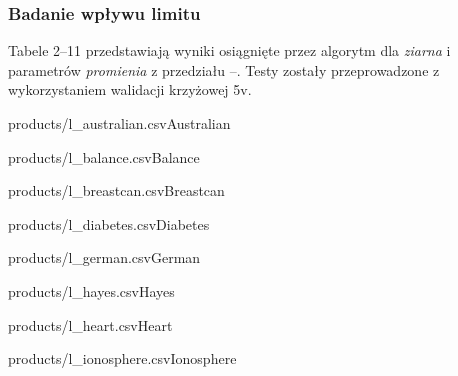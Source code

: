 \documentclass[]{article}
\begin{document}
\FloatBarrier


\subsubsection{Badanie wpływu limitu}

Tabele 2--11 przedstawiają wyniki osiągnięte przez algorytm dla \emph{ziarna}  i parametrów \emph{promienia} z przedziału --. Testy zostały przeprowadzone z wykorzystaniem walidacji krzyżowej \oldstylenums5v.

\begin{table}[htb]
    \parbox{.45\linewidth}{
	    \begin{ridel}{products/l_australian.csv}{Australian}\end{ridel}
	}
	\hfill
    \parbox{.45\linewidth}{
	    \begin{ridel}{products/l_balance.csv}{Balance}\end{ridel}
	}
\end{table}

\begin{table}[!ht]
    \parbox{.45\linewidth}{
	    \begin{ridel}{products/l_breastcan.csv}{Breastcan}\end{ridel}
	}
	\hfill
    \parbox{.45\linewidth}{
	    \begin{ridel}{products/l_diabetes.csv}{Diabetes}\end{ridel}
	}
\end{table}


\begin{table}[!ht]
    \parbox{.45\linewidth}{
	    \begin{ridel}{products/l_german.csv}{German}\end{ridel}
	}
	\hfill
    \parbox{.45\linewidth}{
	    \begin{ridel}{products/l_hayes.csv}{Hayes}\end{ridel}
	}
\end{table}

\begin{table}[!ht]
    \parbox{.45\linewidth}{
	    \begin{ridel}{products/l_heart.csv}{Heart}\end{ridel}
	}
	\hfill
    \parbox{.45\linewidth}{
	    \begin{ridel}{products/l_ionosphere.csv}{Ionosphere}\end{ridel}
	}
\end{table}
\end{document}
